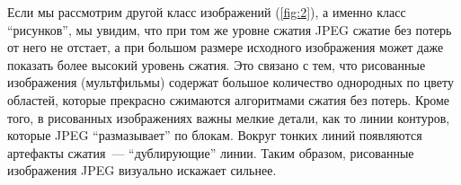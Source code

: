 \documentclass[12pt,a4paper]{article}
\begin{document}
            Если мы рассмотрим другой класс изображений (\autoref{fig:2}), а именно класс \enquote{рисунков}, мы увидим, что при том же уровне сжатия JPEG сжатие без потерь от него не отстает, а при большом размере исходного изображения может даже показать более высокий уровень сжатия. Это связано с тем, что рисованные изображения (мультфильмы) содержат большое количество однородных по цвету областей, которые прекрасно сжимаются алгоритмами сжатия без потерь. Кроме того, в рисованных изображениях важны мелкие детали, как то линии контуров, которые JPEG \enquote{размазывает} по блокам. Вокруг тонких линий появляются артефакты сжатия~--- \enquote{дублирующие} линии. Таким образом, рисованные изображения JPEG визуально искажает сильнее.
            \begin{figure}[!htb]%
                \centering
                \hspace{8pt}%
                \hspace{8pt}%

\end{figure}
\end{document}
